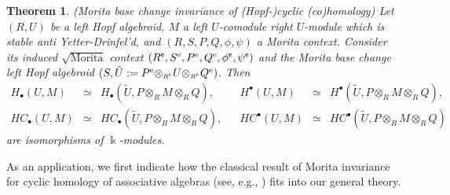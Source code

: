 \documentclass[reqno, a4paper, 10pt]{amsart}
\numberwithin{equation}{section}
\theoremstyle{plain}
\newtheorem{thm}[theorem]{Theorem}
\theoremstyle{definition}
\theoremstyle{remark}
\begin{document}
{

\begin{thm}{\em (Morita base change invariance of (Hopf-)cyclic (co)homology)}
Let $(R, U)$ be a left Hopf algebroid, $M$ a left $U$-comodule right $U$-module which is stable anti Yetter-Drinfel'd, and $(R,S,P,Q,\phi,\psi)$ a Morita context. Consider  its induced  $\sqrt{\mbox{Morita}}$ context $(R^{{\mathsf{{e}}}},{{S^{\rm e}}},{{P^{\rm e}}},{{Q^{\rm e}}},\phi^{{\mathsf{{e}}}},\psi^{{\mathsf{{e}}}})$ and the Morita base change left Hopf algebroid $(S,\tilde{U}:= {{P^{\rm e}}} {\otimes_{\scriptscriptstyle{{\scriptscriptstyle{{R^{\rm e}}}}}}}U{\otimes_{\scriptscriptstyle{{\scriptscriptstyle{{R^{\rm e}}}}}}}{{Q^{\rm e}}})$. Then
$$
\begin{array}{rclcrcl}
H_{{\scriptscriptstyle{\bullet}}}(U, M) &\simeq& H_{{\scriptscriptstyle{\bullet}}}({\tilde{{U}}}, P \otimes_{{\scriptscriptstyle{R}}} M \otimes_{{\scriptscriptstyle{R}}} Q), && H^{{\scriptscriptstyle{\bullet}}}(U, M) &\simeq& H^{{\scriptscriptstyle{\bullet}}}({\tilde{{U}}}, P \otimes_{{\scriptscriptstyle{R}}} M \otimes_{{\scriptscriptstyle{R}}} Q), \\
HC_{{\scriptscriptstyle{\bullet}}}(U, M) &\simeq& HC_{{\scriptscriptstyle{\bullet}}}({\tilde{{U}}}, P \otimes_{{\scriptscriptstyle{R}}} M \otimes_{{\scriptscriptstyle{R}}} Q), && HC^{{\scriptscriptstyle{\bullet}}}(U, M) &\simeq& HC^{{\scriptscriptstyle{\bullet}}}({\tilde{{U}}}, P \otimes_{{\scriptscriptstyle{R}}} M \otimes_{{\scriptscriptstyle{R}}} Q)
\end{array}
$$
are isomorphisms of $\Bbbk$-modules.
\end{thm}
}
As an application, we first indicate how the classical result of Morita invariance for cyclic homology of associative algebras (see, e.g., \cite{Con:NCDG, DenIgu:HHATSOFP, McC:MEACH}) fits into our general theory. 
\end{document}
